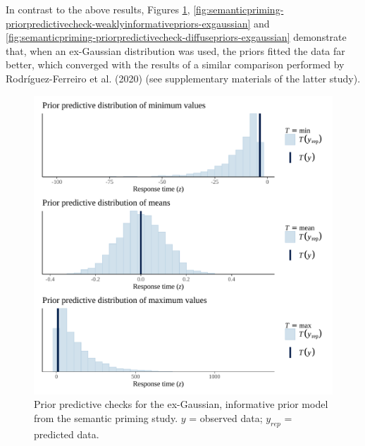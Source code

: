 \documentclass[
  12pt,
  man,floatsintext]{apa7}
\begin{document}
In contrast to the above results, Figures \ref{fig:semanticpriming-priorpredictivecheck-informativepriors-exgaussian}, \ref{fig:semanticpriming-priorpredictivecheck-weaklyinformativepriors-exgaussian} and \ref{fig:semanticpriming-priorpredictivecheck-diffusepriors-exgaussian} demonstrate that, when an ex-Gaussian distribution was used, the priors fitted the data far better, which converged with the results of a similar comparison performed by Rodríguez-Ferreiro et al. (2020) (see supplementary materials of the latter study).



\begin{figure}

{\centering \includegraphics[width=0.8\linewidth]{../semanticpriming/bayesian_analysis/prior_predictive_checks/plots/semanticpriming_priorpredictivecheck_informativepriors_exgaussian} 

}

\caption{Prior predictive checks for the ex-Gaussian, informative prior model from the semantic priming study. \(y\) = observed data; \(y_{rep}\) = predicted data.}\label{fig:semanticpriming-priorpredictivecheck-informativepriors-exgaussian}
\end{figure}
\end{document}
